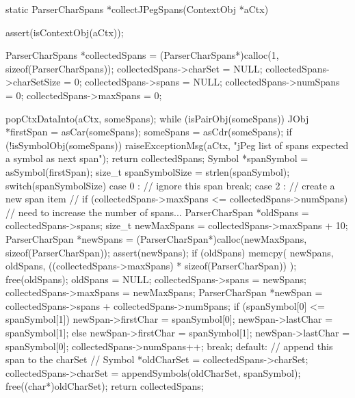 static ParserCharSpans *collectJPegSpans(ContextObj *aCtx) {
  assert(isContextObj(aCtx));
  
  ParserCharSpans *collectedSpans = 
    (ParserCharSpans*)calloc(1, sizeof(ParserCharSpans));
  collectedSpans->charSet     = NULL;
  collectedSpans->charSetSize = 0;
  collectedSpans->spans       = NULL;
  collectedSpans->numSpans    = 0;
  collectedSpans->maxSpans    = 0;
  
  popCtxDataInto(aCtx, someSpans);
  while (isPairObj(someSpans)) {
    JObj *firstSpan = asCar(someSpans);
    someSpans       = asCdr(someSpans);
    if (!isSymbolObj(someSpans)) {
      raiseExceptionMsg(aCtx,
        "jPeg list of spans expected a symbol as next span");
      return collectedSpans; 
    }
    Symbol *spanSymbol     = asSymbol(firstSpan);
    size_t  spanSymbolSize = strlen(spanSymbol);
    switch(spanSymbolSize) {
      case 0 :
        // ignore this span
        break;
      case 2 :
        // create a new span item
        //
        if (collectedSpans->maxSpans <= collectedSpans->numSpans) {
          // need to increase the number of spans...
          ParserCharSpan *oldSpans = collectedSpans->spans;
          size_t newMaxSpans       = collectedSpans->maxSpans + 10;
          ParserCharSpan *newSpans =
            (ParserCharSpan*)calloc(newMaxSpans, sizeof(ParserCharSpan));
          assert(newSpans);
          if (oldSpans) {
            memcpy(
              newSpans,
              oldSpans,
              ((collectedSpans->maxSpans) * sizeof(ParserCharSpan))
            );
            free(oldSpans);
            oldSpans = NULL;
          }
          collectedSpans->spans    = newSpans;
          collectedSpans->maxSpans = newMaxSpans;
        }
        ParserCharSpan *newSpan =
          collectedSpans->spans + collectedSpans->numSpans;
        if (spanSymbol[0] <= spanSymbol[1]) {
          newSpan->firstChar = spanSymbol[0];
          newSpan->lastChar  = spanSymbol[1];
        } else {
          newSpan->firstChar = spanSymbol[1];
          newSpan->lastChar  = spanSymbol[0];
        }
        collectedSpans->numSpans++;
        break;
      default: {
        // append this span to the charSet
        //
        Symbol *oldCharSet = collectedSpans->charSet;
        collectedSpans->charSet =
          appendSymbols(oldCharSet, spanSymbol);
        free((char*)oldCharSet);
      }
    }
  }
  return collectedSpans;
}

